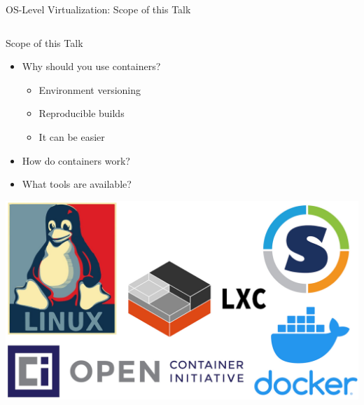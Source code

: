 \documentclass[10pt, compress, aspectratio=169, xcolor={table,usenames,dvipsnames}]{beamer}
\begin{document}
\begin{frame}[label={sec:orgb4724f6}]{OS-Level Virtualization: Scope of this Talk}
\begin{columns}
\begin{column}{0.4\columnwidth}
\begin{block}{Scope of this Talk}
\begin{itemize}
\item Why should you \alert{use containers}?
\begin{itemize}
\item Environment versioning
\item Reproducible builds
\item It can be \alert{easier}
\end{itemize}
\item How do containers \alert{work}?
\item What \alert{tools} are available?
\end{itemize}

\begin{center}
\includegraphics[width=.8\columnwidth]{../../img/containers.jpg}
\end{center}
\end{block}
\end{column}


\end{columns}
\end{frame}
\end{document}
